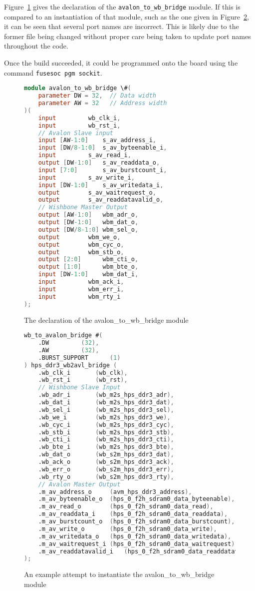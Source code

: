 Figure~\ref{fig:wb_dec} gives the declaration of the \verb|avalon_to_wb_bridge| module. If this is compared to an instantiation of that module, such as the one given in Figure~\ref{fig:wb_inst}, it can be seen that several port names are incorrect. This is likely due to the former file being changed without proper care being taken to update port names throughout the code.

Once the build succeeded, it could be programmed onto the board using the command \verb|fusesoc pgm sockit|.

\begin{figure}[t]
  \centering
  \begin{lstlisting}[language=Verilog]
module avalon_to_wb_bridge \#(
	parameter DW = 32,	// Data width
	parameter AW = 32	// Address width
)(
	input 		  wb_clk_i,
	input 		  wb_rst_i,
	// Avalon Slave input
	input [AW-1:0] 	  s_av_address_i,
	input [DW/8-1:0]  s_av_byteenable_i,
	input 		  s_av_read_i,
	output [DW-1:0]   s_av_readdata_o,
	input [7:0] 	  s_av_burstcount_i,
	input 		  s_av_write_i,
	input [DW-1:0] 	  s_av_writedata_i,
	output 		  s_av_waitrequest_o,
	output 		  s_av_readdatavalid_o,
	// Wishbone Master Output
	output [AW-1:0]   wbm_adr_o,
	output [DW-1:0]   wbm_dat_o,
	output [DW/8-1:0] wbm_sel_o,
	output 		  wbm_we_o,
	output 		  wbm_cyc_o,
	output 		  wbm_stb_o,
	output [2:0] 	  wbm_cti_o,
	output [1:0] 	  wbm_bte_o,
	input [DW-1:0] 	  wbm_dat_i,
	input 		  wbm_ack_i,
	input 		  wbm_err_i,
	input 		  wbm_rty_i
);
  \end{lstlisting}
  \caption{The declaration of the avalon\_to\_wb\_bridge module\cite{wb_dec}}
  \label{fig:wb_dec}
\end{figure}

\begin{figure}[t]
  \centering
  \begin{lstlisting}[language=Verilog]
wb_to_avalon_bridge #(
	.DW			(32),
	.AW			(32),
	.BURST_SUPPORT		(1)
) hps_ddr3_wb2avl_bridge (
	.wb_clk_i		(wb_clk),
	.wb_rst_i		(wb_rst),
	// Wishbone Slave Input
	.wb_adr_i		(wb_m2s_hps_ddr3_adr),
	.wb_dat_i		(wb_m2s_hps_ddr3_dat),
	.wb_sel_i		(wb_m2s_hps_ddr3_sel),
	.wb_we_i		(wb_m2s_hps_ddr3_we),
	.wb_cyc_i		(wb_m2s_hps_ddr3_cyc),
	.wb_stb_i		(wb_m2s_hps_ddr3_stb),
	.wb_cti_i		(wb_m2s_hps_ddr3_cti),
	.wb_bte_i		(wb_m2s_hps_ddr3_bte),
	.wb_dat_o		(wb_s2m_hps_ddr3_dat),
	.wb_ack_o		(wb_s2m_hps_ddr3_ack),
	.wb_err_o		(wb_s2m_hps_ddr3_err),
	.wb_rty_o		(wb_s2m_hps_ddr3_rty),
	// Avalon Master Output
	.m_av_address_o		(avm_hps_ddr3_address),
	.m_av_byteenable_o	(hps_0_f2h_sdram0_data_byteenable),
	.m_av_read_o		(hps_0_f2h_sdram0_data_read),
	.m_av_readdata_i	(hps_0_f2h_sdram0_data_readdata),
	.m_av_burstcount_o	(hps_0_f2h_sdram0_data_burstcount),
	.m_av_write_o		(hps_0_f2h_sdram0_data_write),
	.m_av_writedata_o	(hps_0_f2h_sdram0_data_writedata),
	.m_av_waitrequest_i	(hps_0_f2h_sdram0_data_waitrequest),
	.m_av_readdatavalid_i	(hps_0_f2h_sdram0_data_readdatavalid)
);
  \end{lstlisting}
  \caption{An example attempt to instantiate the avalon\_to\_wb\_bridge module\cite{wb_inst}}
  \label{fig:wb_inst}
\end{figure}

